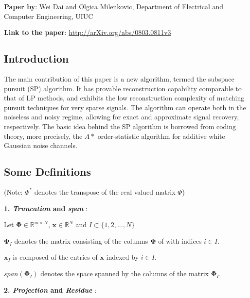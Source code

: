 \documentclass[fleqn, 11pt]{article}
\newcommand{\bs}[1]{\boldsymbol{#1}}
\newcommand{\R}[0]{\mathbb{R}}
\begin{document}
\textbf{Paper by}: Wei Dai and Olgica Milenkovic, 
Department of Electrical and Computer Engineering, UIUC

\medskip

\textbf{Link to the paper}: \url{http://arXiv.org/abs/0803.0811v3}

\hrulefill

\subsection*{Introduction}

The main contribution of this paper is a new algorithm,
termed the subspace pursuit (SP) algorithm. It has provable
reconstruction capability comparable to that of LP methods,
and exhibits the low reconstruction complexity of matching
pursuit techniques for very sparse signals. The algorithm can
operate both in the noiseless and noisy regime, allowing
for exact and approximate signal recovery, respectively.
The basic idea behind the SP algorithm is borrowed from
coding theory, more precisely, the $A*$ order-statistic algorithm  
for additive white Gaussian noise channels.

\hrulefill

\subsection*{Some Definitions}

(Note: $\Phi^*$ denotes the transpose of the real valued matrix $\Phi$)

\medskip


\textbf{1. \textit{Truncation} and \textit{span} }: 

\smallskip

Let $\bs{\Phi} \in \R^{m \times N}$, $\bs{x} \in \R^N$ and $I \subset \{ 1,2,..., N \} $ 

\smallskip

$\bs{\Phi}_{I}$ denotes the matrix consisting of the columns $\bs{\Phi}$ of with indices $i \in I$. 

\smallskip

$\bs{x}_{I}$ is composed of the entries of $\bs{x}$
indexed by $i \in I$. 

\smallskip

$span(\bs{\Phi}_{I})$ denotes the space spanned by the columns of the matrix $\bs{\Phi}_{I}$.


\bigskip 

\textbf{2. \textit{Projection} and \textit{Residue} }: 
\end{document}
